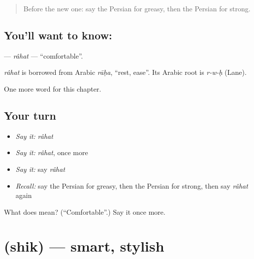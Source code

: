\label{lesson:FA-C199-rahat}



\begin{quote}
Before the new one: say the Persian for greasy, then the Persian for strong.
\end{quote}

\subsection*{You'll want to know: }
\textbf{} — \emph{râhat} — \textquotedblleft{}comfortable\textquotedblright{}.

\begin{cousinweb}
\emph{râhat} is borrowed from Arabic \emph{rāḥa}, \textquotedblleft{}rest, ease\textquotedblright{}. Its Arabic root is \emph{r-w-ḥ} (Lane).
\end{cousinweb}

\begin{grammarlens}[title={What you've built}]
One more word for this chapter.
\end{grammarlens}

\subsection*{Your turn}
\begin{itemize}
\raggedright
  \item \emph{Say it:} \emph{râhat}
  \item \emph{Say it:} \emph{râhat}, once more
  \item \emph{Say it:} say \emph{râhat}
  \item \emph{Recall:} say the Persian for greasy, then the Persian for strong, then say \emph{râhat} again
\end{itemize}

\begin{tcolorbox}[breakable,colback=teal!4,colframe=teal!35!black,title={Before you move on}]
What does  mean? (\textquotedblleft{}Comfortable\textquotedblright{}.) Say it once more.
\end{tcolorbox}
\section[\texorpdfstring{\fa{شیک} (shik)}{شیک (shik)}]{ (shik) — smart, stylish}

\label{lesson:FA-C199-shik}



